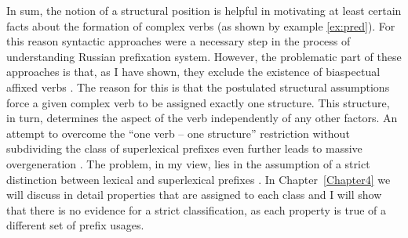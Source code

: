 %
In sum, the notion of a structural position is helpful in motivating at least certain facts about the formation of complex verbs  (as shown by example \ref{ex:pred}). For this reason syntactic approaches were a necessary step in the process of understanding Russian prefixation  system. However, the problematic part of these approaches is that, as I have shown, they exclude the existence of biaspectual affixed verbs . The reason for this is that the postulated structural assumptions force a given complex verb to be assigned exactly one structure. This structure, in turn, determines the aspect of the verb independently of any other factors. An attempt to overcome the ``one verb -- one structure'' restriction without subdividing the class of superlexical prefixes  even further  \citep{Tatevosov:13} leads to massive overgeneration . The problem, in my view, lies in the assumption of a strict distinction between lexical and superlexical prefixes . In Chapter~\ref{Chapter4} we will discuss in detail properties that are assigned to each class and I will show that there is no evidence for a strict classification, as each property is true of a different set of prefix usages.

